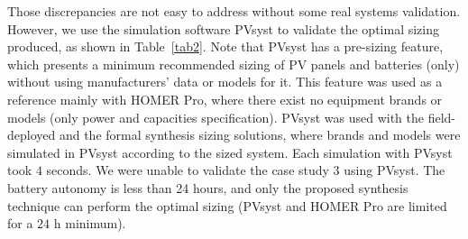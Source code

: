 \documentclass[journal]{IEEEtran}
\begin{document}
Those discrepancies are not easy to address without some real systems validation. However, we use the simulation software PVsyst to validate the optimal sizing produced, as shown in Table~\ref{tab2}. Note that PVsyst has a pre-sizing feature, which presents a minimum recommended sizing of PV panels and batteries (only) without using manufacturers' data or models for it. This feature was used as a reference mainly with HOMER Pro, where there exist no equipment brands or models (only power and capacities specification). PVsyst was used with the field-deployed and the formal synthesis sizing solutions, where brands and models were simulated in PVsyst according to the sized system. Each simulation with PVsyst took $4$ seconds. We were unable to validate the case study $3$ using PVsyst. The battery autonomy is less than 24 hours, and only the proposed synthesis technique can perform the optimal sizing (PVsyst and HOMER Pro are limited for a $24$ h minimum).
%
\end{document}
